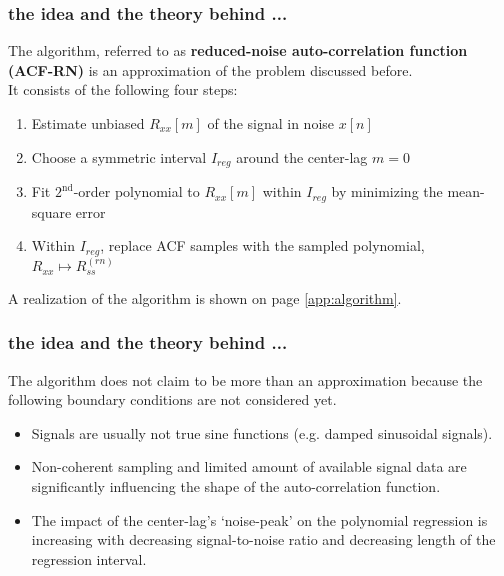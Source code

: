 \documentclass[11pt,aspectratio=169]{beamer}
\begin{document}
	\begin{frame}
		\frametitle{\appendixname{} \textendash{} the idea and the theory behind ...}
		The algorithm, referred to as \textbf{reduced-noise auto-correlation function (ACF-RN)} is an approximation of the problem discussed before.\\
		\vspace*{1em}
		It consists of the following four steps:
		\begin{enumerate}
			\item Estimate unbiased $R_{xx}[m]$ of the signal in noise $x[n]$
			\item Choose a symmetric interval $I_{reg}$ around the center-lag $m = 0$
			\item Fit $2^{\text{nd}}$-order polynomial to $R_{xx}[m]$ within $I_{reg}$ by minimizing the mean-square error
			\item Within $I_{reg}$, replace ACF samples with the sampled polynomial, $R_{xx} \mapsto R^{(rn)}_{ss}$
		\end{enumerate}
		\vspace*{1em}
		A realization of the algorithm is shown on page \ref{app:algorithm}.
	\end{frame}
	\begin{frame}
		\frametitle{\appendixname{} \textendash{} the idea and the theory behind ...}
		The algorithm does not claim to be more than an approximation because the following boundary conditions are not considered yet.\\
		\vspace*{.5em}
		\begin{itemize}
			\item Signals are usually not true sine functions (e.g. damped sinusoidal signals).
			\item Non-coherent sampling and limited amount of available signal data are significantly influencing the shape of the auto-correlation function.
			\item The impact of the center-lag's `noise-peak' on the polynomial regression is increasing with decreasing signal-to-noise ratio and decreasing length of the regression interval.
		\end{itemize}
	\end{frame}
\end{document}

